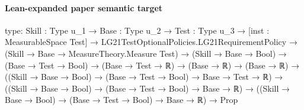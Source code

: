 \documentclass[10pt]{article}
\begin{document}
\paragraph{Lean-expanded paper semantic target}
\begin{ReviewVerbatim}
type:
{Skill : Type u_1} →
  {Base : Type u_2} →
    {Test : Type u_3} →
      [inst : MeasurableSpace Test] →
        LG21TestOptionalPolicies.LG21RequirementPolicy →
          (Skill → Base → MeasureTheory.Measure Test) →
            (Skill → Base → Bool) →
              (Base → Test → Bool) →
                (Base → Test → ℝ) →
                  (Base → ℝ) →
                    (Base → ℝ) →
                      ((Skill → Base → Bool) → (Base → Test → Bool) → Base → Test → ℝ) →
                        ((Skill → Base → Bool) → (Base → Test → Bool) → Base → ℝ) →
                          ((Skill → Base → Bool) → (Base → Test → Bool) → Base → ℝ) → Prop


\end{ReviewVerbatim}
\end{document}
